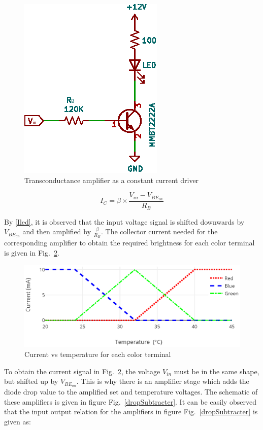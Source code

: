 \documentclass[conference]{IEEEtran}
\begin{document}
\begin{figure}[h]
\centerline{\includegraphics[scale=1]{figures/transcond-amp.eps}}
\caption{Transconductance amplifier as a constant current driver}
\label{transcondAmp}
\end{figure}

\begin{equation}
I_{C} = \beta \times \frac{V_{in}-V_{BE_{on}}}{R_{B}}\label{Iled}
\end{equation}


By \eqref{Iled}, it is observed that the input voltage signal is shifted downwards by $V_{BE_{on}}$ and then amplified by $\frac{\beta}{R_{B}}$. The collector current needed for the corresponding amplifier to obtain the required brightness for each color terminal is given in Fig.~\ref{ILED}.

\begin{figure}[h]
\centerline{\includegraphics[scale=0.58]{figures/current_vs_temp.eps}}
\vspace{-1em}
\caption{Current vs temperature for each color terminal}
\label{ILED}
\end{figure}

To obtain the current signal in Fig.~\ref{ILED}, the voltage $V_{in}$ must be in the same shape, but shifted up by $V_{BE_{on}}$. This is why there is an amplifier stage which adds the diode drop value to the amplified set and temperature voltages. The schematic of these amplifiers is given in figure Fig.~\ref{dropSubtracter}. It can be easily observed that the input output relation for the amplifiers in figure Fig.~\ref{dropSubtracter} is given as:
\end{document}
